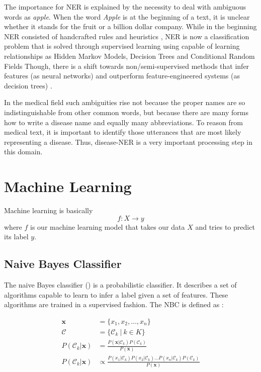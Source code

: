 The importance for NER is explained by the necessity to deal with ambiguous words as \textit{apple}. When the word \textit{Apple} is at the beginning of a text, it is unclear whether it stands for the fruit or a billion dollar company. While in the beginning NER consisted of handcrafted rules and heuristics \citep{Rau1991}, NER is now a classification problem that is solved through supervised learning using capable of learning relationships as Hidden Markov Models, Decision Trees and Conditional Random Fields \citep{Nadeau2009} Though, there is a shift towards non/semi-supervised methods that infer features (as neural networks) and outperform feature-engineered systems (as decision trees) \citep{Yadav2018}.

In the medical field such ambiguities rise not because the proper names are so indistinguishable from other common words, but because there are many forms how to write a disease name and equally many abbreviations. To reason from medical text, it is important to identify those utterances that are most likely representing a disease. Thus, disease-NER is a very important processing step in this domain.

\section{Machine Learning}
Machine learning is basically \[f: X \rightarrow y\] where $f$ is our machine learning model that takes our data $X$ and tries to predict its label $y$.


\subsection{Naive Bayes Classifier}
The naive Bayes classifier () is a probabilistic classifier. It describes a set
of algorithms capable to learn to infer a label given a set of features. These
algorithms are trained in a supervised fashion. The NBC is defined as :

\begin{align}
  \boldsymbol{x} &= \{x_1, x_2, \dots, x_n\} \\
  \mathcal{C} &= \{\mathcal{C}_k \: | \: k \in K \} \\
  P(\mathcal{C}_k|\boldsymbol{x}) &= \frac{P(\boldsymbol{x} |\mathcal{C}_k) P(\mathcal{C}_k)} {P(\boldsymbol{x})} \\
  P(\mathcal{C}_k|\boldsymbol{x}) &\propto \frac{P(x_1 |\mathcal{C}_k)
                                       P(x_2 |\mathcal{C}_k) \dots
                                       P(x_n |\mathcal{C}_k)
                                       P(\mathcal{C}_k)}{ P(\boldsymbol{x})}
\end{align}

